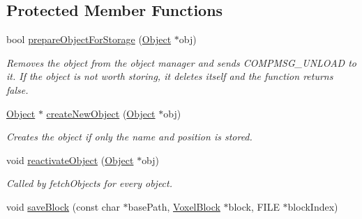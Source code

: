 \subsection*{\-Protected \-Member \-Functions}
\begin{DoxyCompactItemize}
\item 
\hypertarget{classGameDataStorage_a3d63e9b74a118c6d7de007ab01530051}{
bool \hyperlink{classGameDataStorage_a3d63e9b74a118c6d7de007ab01530051}{prepare\-Object\-For\-Storage} (\hyperlink{classObject}{\-Object} $\ast$obj)}
\label{dc/d0b/classGameDataStorage_a3d63e9b74a118c6d7de007ab01530051}

\begin{DoxyCompactList}\small\item\em \-Removes the object from the object manager and sends \-C\-O\-M\-P\-M\-S\-G\-\_\-\-U\-N\-L\-O\-A\-D to it. \-If the object is not worth storing, it deletes itself and the function returns false. \end{DoxyCompactList}\item 
\hypertarget{classGameDataStorage_a2cf5e97a4b94ba097b9ca9a224867003}{
\hyperlink{classObject}{\-Object} $\ast$ \hyperlink{classGameDataStorage_a2cf5e97a4b94ba097b9ca9a224867003}{create\-New\-Object} (\hyperlink{classObject}{\-Object} $\ast$obj)}
\label{dc/d0b/classGameDataStorage_a2cf5e97a4b94ba097b9ca9a224867003}

\begin{DoxyCompactList}\small\item\em \-Creates the object if only the name and position is stored. \end{DoxyCompactList}\item 
\hypertarget{classGameDataStorage_a37864d6adee31b14ddebdebf1c3ca4df}{
void \hyperlink{classGameDataStorage_a37864d6adee31b14ddebdebf1c3ca4df}{reactivate\-Object} (\hyperlink{classObject}{\-Object} $\ast$obj)}
\label{dc/d0b/classGameDataStorage_a37864d6adee31b14ddebdebf1c3ca4df}

\begin{DoxyCompactList}\small\item\em \-Called by fetch\-Objects for every object. \end{DoxyCompactList}\item 
\hypertarget{classGameDataStorage_a4a6a2cccef5a0b888bed40941976b51e}{
void \hyperlink{classGameDataStorage_a4a6a2cccef5a0b888bed40941976b51e}{save\-Block} (const char $\ast$base\-Path, \hyperlink{classVoxelBlock}{\-Voxel\-Block} $\ast$block, \-F\-I\-L\-E $\ast$block\-Index)}
\label{dc/d0b/classGameDataStorage_a4a6a2cccef5a0b888bed40941976b51e}


\end{DoxyCompactItemize}
